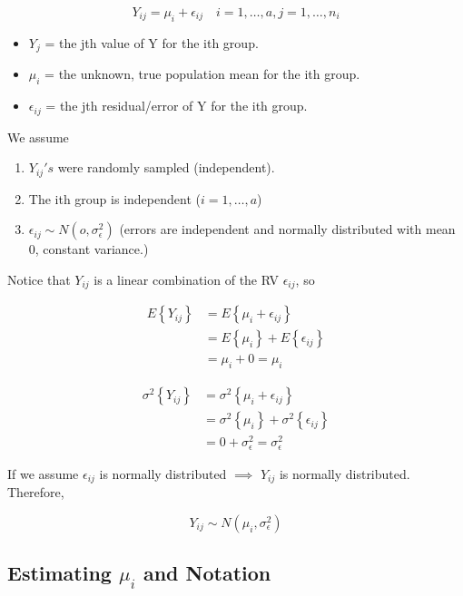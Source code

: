 \documentclass[10pt]{article}
\newcommand{\mean}[1]{\mu_{#1}}
\renewcommand{\exp}[1]{E\left\{#1\right\}} %
\newcommand{\var}[1]{\sigma^2\left\{#1\right\}}
\newcommand{\sigvar}[1]{\sigma^2_{#1}} %
\newcommand{\err}[1]{\epsilon_{#1}}
\begin{document}
\begin{multicols}{3}
    \begin{equation*}
        Y_{ij} = \mean{i} + \err{ij} \quad i=1,\dots,a, j=1,\dots,n_i
    \end{equation*}

    \begin{itemize}
        \item $Y_{j}$ = the jth value of Y for the ith group.
        \item $\mean{i}$ = the unknown, true population mean for the ith group.
        \item $\err{ij}$ = the jth residual/error of Y for the ith group.
    \end{itemize}

    We assume
    \begin{enumerate}
        \item $Y_{ij}'s$ were randomly sampled (independent).
        \item The ith group is independent ($i=1,\dots,a$)
        \item $\err{ij} \sim N(o, \sigvar{\epsilon})$ (errors are independent and normally distributed with mean 0, constant variance.)
    \end{enumerate}

    Notice that $Y_{ij}$ is a linear combination of the RV $\err{ij}$, so

    \begin{align*}
        \exp{Y_{ij}} & = \exp{\mean{i} + \err{ij}} \\
                    & = \exp{\mean{i}} + \exp{\err{ij}} \\
                    & = \mean{i} + 0 = \mean{i}
    \end{align*}

    \begin{align*}
        \var{Y_{ij}} & = \var{\mean{i} + \err{ij}} \\
                & = \var{\mean{i}} + \var{\err{ij}} \\
                & = 0 + \sigvar{\epsilon} = \sigvar{\epsilon}
    \end{align*}

    If we assume $\err{ij}$ is normally distributed $\implies$ $Y_{ij}$ is normally distributed. Therefore, 

    \begin{equation*}
        Y_{ij} \sim N(\mean{i}, \sigvar{\epsilon})
    \end{equation*}

    \subsection{Estimating \texorpdfstring{$\mean{i}$}{mui} and Notation}


\end{multicols}
\end{document}
